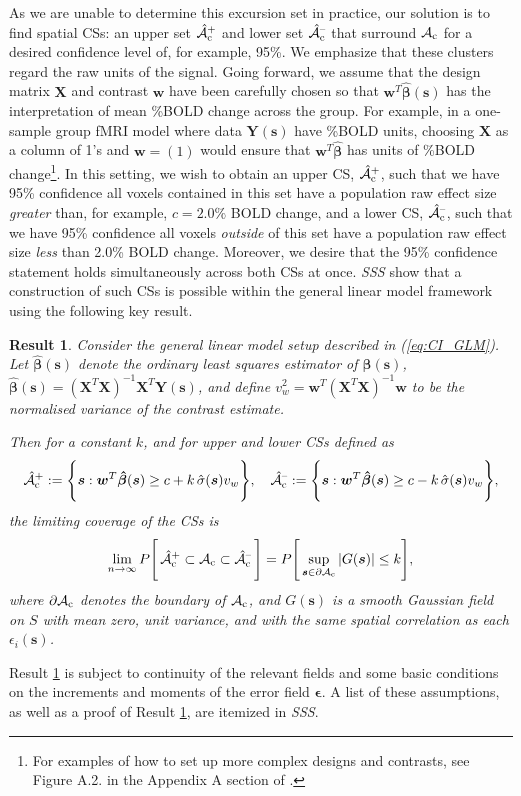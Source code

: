 As we are unable to determine this excursion set in practice, our solution is to find spatial CSs: an upper set $\operatorname{\hat{\mathcal{A}}_{c}^+}$ and lower set $\operatorname{\hat{\mathcal{A}}_{c}^{\textrm{--}}}$ that surround $\operatorname{\mathcal{A}_{c}}$ for a desired confidence level of, for example, 95\%. We emphasize that these clusters regard the raw units of the signal. Going forward, we assume that the design matrix $\bm{X}$ and contrast $\bm{w}$ have been carefully chosen so that $\bm{w}^{T}\hat{\bm{\beta}}(\bm{s})$ has the interpretation of mean \%BOLD change across the group. For example, in a one-sample group fMRI model where data $\bm{Y}(\bm{s})$ have \%BOLD units, choosing $\bm{X}$ as a column of 1's and $\bm{w}=(1)$ would ensure that $\bm{w}^{T}\hat{\bm{\beta}}$ has units of \%BOLD change\footnote{For examples of how to set up more complex designs and contrasts, see Figure A.2. in the Appendix A section of \citep{Poldrack2011-bw}.}. In this setting, we wish to obtain an upper CS, $\operatorname{\hat{\mathcal{A}}_{c}^+}$, such that we have 95\% confidence all voxels contained in this set have a population raw effect size \textit{greater} than, for example, $c = 2.0\%$ BOLD change, and a lower CS, $\operatorname{\hat{\mathcal{A}}_{c}^{\textrm{--}}}$, such that we have 95\% confidence all voxels \textit{outside} of this set have a population raw effect size \textit{less} than 2.0\% BOLD change. Moreover, we desire that the 95\% confidence statement holds simultaneously across both CSs at once.
\textit{SSS} show that a construction of such CSs is possible within the general linear model framework using the following key result. 

\newtheorem{theorem}{Result}
\begin{theorem}
\label{thm:SSS_result}
Consider the general linear model setup described in (\ref{eq:CI_GLM}). Let $\hat{\bm{\beta}}(\bm{s})$ denote the ordinary least squares estimator of $\bm{\beta}(\bm{s})$, $\hat{\bm{\beta}}(\bm{s})=(\bm{X}^T\bm{X})^{-1}\bm{X}^T\bm{Y}(\bm{s})$, and define
$v^{2}_{w}=\bm{w}^T(\bm{X}^T\bm{X})^{-1}\bm{w}$ 
to be the normalised variance of the contrast estimate.

Then for a constant $k$, and for upper and lower CSs defined as
$$\operatorname{\hat{\mathcal{A}}_{c}^+} := \Bigg\{\bm{s} : \bm{w}^{T}\bm{\hat{\beta}}(\bm{s}) \geq c + k\, \hat{\sigma}(\bm{s}) v_{w} \Bigg\}, \quad \operatorname{\hat{\mathcal{A}}_{c}^{\textrm{--}}} := \Bigg\{\bm{s} : \bm{w}^{T}\bm{\hat{\beta}}(\bm{s}) \geq c - k \,\hat{\sigma}(\bm{s}) v_{w}  \Bigg\},$$ 
the limiting coverage of the CSs is
$$\lim_{n\rightarrow\infty} P  \Bigg[\operatorname{\hat{\mathcal{A}}_{c}^+} \subset \operatorname{\mathcal{A}_{c}} \subset \operatorname{\hat{\mathcal{A}}_{c}^{\textrm{--}}}\Bigg] = P \Bigg[\sup_{\bm{s}\in\operatorname{\partial\mathcal{A}_{c}}}|G(\bm{s})|\leq k\Bigg],$$
where $\operatorname{\partial\mathcal{A}_{c}}$ denotes the boundary of $\operatorname{\mathcal{A}_{c}}$, and $G(\bm{s})$ is a smooth Gaussian field on $S$ with mean zero, unit variance, and with the same spatial correlation as each $\epsilon_i(\bm{s})$. 
\end{theorem}
Result \ref{thm:SSS_result} is subject to continuity of the relevant fields and some basic conditions on the increments and moments of the error field $\bm{\epsilon}$. A list of these assumptions, as well as a proof of Result \ref{thm:SSS_result}, are itemized in \textit{SSS}. 


